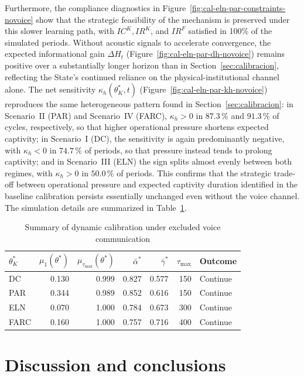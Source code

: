 \documentclass[review,authoryear,12pt]{elsarticle}
\theoremstyle{plain}
\theoremstyle{definition}
\newcommand{\1}{\mathbf{1}}
\begin{document}
Furthermore, the compliance diagnostics in Figure~\ref{fig:cal-eln-par-constraints-novoice} show that the strategic feasibility of the mechanism is preserved under this slower learning path, with $IC^K, IR^K$, and $IR^F$ satisfied in 100\% of the simulated periods. Without acoustic signals to accelerate convergence, the expected informational gain $\Delta H_t$ (Figure~\ref{fig:cal-eln-par-dh-novoice}) remains positive over a substantially longer horizon than in Section~\ref{sec:calibracion}, reflecting the State's continued reliance on the physical-institutional channel alone. The net sensitivity $\kappa_h(\theta_K^\ast,t)$ (Figure~\ref{fig:cal-eln-par-kh-novoice}) reproduces the same heterogeneous pattern found in Section~\ref{sec:calibracion}: in Scenario~II (PAR) and Scenario~IV (FARC), $\kappa_h>0$ in $87.3\,\%$ and $91.3\,\%$ of cycles, respectively, so that higher operational pressure shortens expected captivity; in Scenario~I (DC), the sensitivity is again predominantly negative, with $\kappa_h<0$ in $74.7\,\%$ of periods, so that pressure instead tends to prolong captivity; and in Scenario~III (ELN) the sign splits almost evenly between both regimes, with $\kappa_h>0$ in $50.0\,\%$ of periods. This confirms that the strategic trade-off between operational pressure and expected captivity duration identified in the baseline calibration persists essentially unchanged even without the voice channel. The simulation details are summarized in Table~\ref{tab:calibracion-resumen-novoice}.

\begin{table}[H]
\centering
\caption{Summary of dynamic calibration under excluded voice communication}
\label{tab:calibracion-resumen-novoice}
\small
\begin{tabular}{lrrrrrl}
\toprule
$\theta_K^\ast$ & $\mu_1(\theta^\ast)$ & $\mu_{\tau_{\max}}(\theta^\ast)$ & $\bar{\alpha}^\ast$ & $\bar{\gamma}^\ast$ & $\tau_{\max}$ & Outcome \\
\midrule
DC & 0.130 & 0.999 & 0.827 & 0.577 & 150 & Continue \\
PAR & 0.344 & 0.989 & 0.852 & 0.616 & 150 & Continue \\
ELN & 0.070 & 1.000 & 0.784 & 0.673 & 300 & Continue \\
FARC & 0.160 & 1.000 & 0.757 & 0.716 & 400 & Continue \\
\bottomrule
\end{tabular}
\end{table}

\section{Discussion and conclusions}\label{sec:conclusiones}
\end{document}
